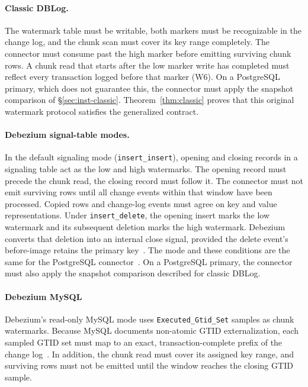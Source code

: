 \documentclass[sigconf,nonacm,10pt]{acmart}
\theoremstyle{plain}
\theoremstyle{definition}
\begin{document}
\paragraph{Classic DBLog.}
The watermark table must be writable, both markers must be recognizable in 
the change log, and the chunk scan must cover its key range completely. 
The connector must consume past the high marker before emitting surviving chunk rows. 
A chunk read that starts after the low marker write has completed must reflect
every transaction logged before that marker (W6). On a PostgreSQL primary,
which does not guarantee this, the connector must apply the snapshot
comparison of \S\ref{sec:inst-classic}.
Theorem~\ref{thm:classic} proves that this original watermark protocol 
satisfies the generalized contract.

\paragraph{Debezium signal-table modes.}
In the default signaling mode (\texttt{insert\_insert}), opening and closing records in a 
signaling table act as the low and high watermarks. The opening record 
must precede the chunk read, the closing record must follow it. The 
connector must not emit surviving rows until all change events within 
that window have been processed. Copied rows and change-log events must 
agree on key and value representations. Under \texttt{insert\_delete}, the opening 
insert marks the low watermark and its subsequent deletion marks the 
high watermark. Debezium converts that deletion into an internal close 
signal, provided the delete event's before-image retains the primary 
key~\cite{debezium_signalling,debezium_signal_delete_source,debezium_mysql_connector}.
The mode and these conditions are the same for the PostgreSQL
connector~\cite{debezium_postgresql_connector}. On a PostgreSQL primary, the connector
must also apply the snapshot comparison described for classic DBLog.

\paragraph{Debezium MySQL}
Debezium's read-only MySQL mode uses \texttt{Executed\_Gtid\_Set} samples as 
chunk watermarks. Because MySQL documents non-atomic GTID externalization, 
each sampled GTID set must map to an exact, transaction-complete prefix 
of the change log~\cite{debezium_mysql_connector,mysql_gtid_lifecycle}. 
In addition, the chunk read must cover its assigned key range, and surviving rows 
must not be emitted until the window reaches the closing GTID sample.
\end{document}
